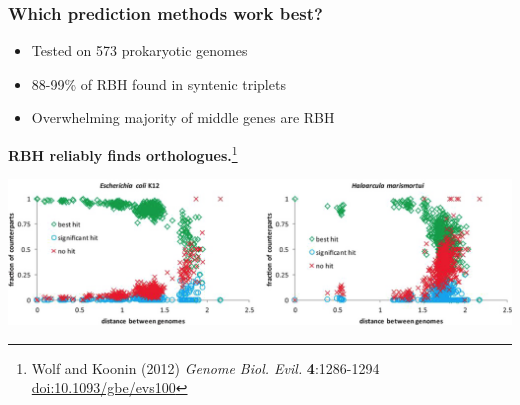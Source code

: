 \begin{frame}
  \frametitle{Which prediction methods work best?}
  \begin{itemize}
    \item Tested on 573 prokaryotic genomes
    \item 88-99\% of RBH found in syntenic triplets
    \item Overwhelming majority of middle genes are RBH
  \end{itemize}
  \textbf{RBH reliably finds orthologues.}\footnote{\tiny{Wolf and Koonin (2012) \textit{Genome Biol. Evil.} \textbf{4}:1286-1294 \href{http://dx.doi.org/10.1093/gbe/evs100}{doi:10.1093/gbe/evs100}}}
  \begin{center}
      \includegraphics[width=1\textwidth]{images/syntenic_triplet_results} 
  \end{center}
\end{frame}


